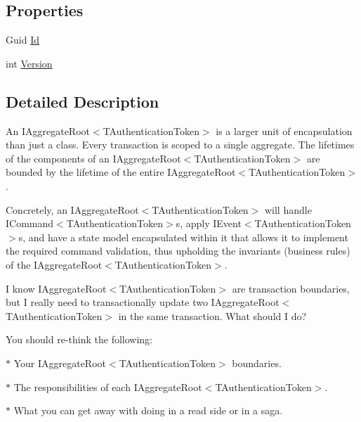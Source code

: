 \subsection*{Properties}
\begin{DoxyCompactItemize}
\item 
Guid \hyperlink{interfaceCqrs_1_1Domain_1_1IAggregateRoot_a04aa3198f1371afa345a58e8fcb713d7_a04aa3198f1371afa345a58e8fcb713d7}{Id}
\item 
int \hyperlink{interfaceCqrs_1_1Domain_1_1IAggregateRoot_ad81adab68c0984330f735a1f5a661aa7_ad81adab68c0984330f735a1f5a661aa7}{Version}
\end{DoxyCompactItemize}


\subsection{Detailed Description}
An I\+Aggregate\+Root$<$\+T\+Authentication\+Token$>$ is a larger unit of encapsulation than just a class. Every transaction is scoped to a single aggregate. The lifetimes of the components of an I\+Aggregate\+Root$<$\+T\+Authentication\+Token$>$ are bounded by the lifetime of the entire I\+Aggregate\+Root$<$\+T\+Authentication\+Token$>$. 

Concretely, an I\+Aggregate\+Root$<$\+T\+Authentication\+Token$>$ will handle I\+Command$<$\+T\+Authentication\+Token$>$s, apply I\+Event$<$\+T\+Authentication\+Token$>$s, and have a state model encapsulated within it that allows it to implement the required command validation, thus upholding the invariants (business rules) of the I\+Aggregate\+Root$<$\+T\+Authentication\+Token$>$. 

I know I\+Aggregate\+Root$<$\+T\+Authentication\+Token$>$ are transaction boundaries, but I really need to transactionally update two I\+Aggregate\+Root$<$\+T\+Authentication\+Token$>$ in the same transaction. What should I do?

You should re-\/think the following\+: 

$\ast$ Your I\+Aggregate\+Root$<$\+T\+Authentication\+Token$>$ boundaries. 

$\ast$ The responsibilities of each I\+Aggregate\+Root$<$\+T\+Authentication\+Token$>$. 

$\ast$ What you can get away with doing in a read side or in a saga. 

